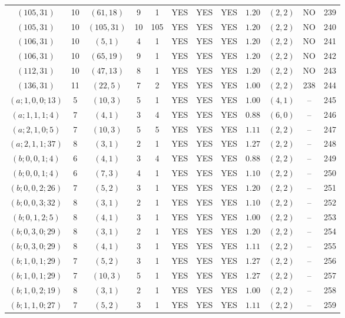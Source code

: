 \begin{longtable}{|c|c|c|c|c|c|c|c|c|c|c|c|}
$(105,31)$ & 10 & $(61,18)$ & 9 & 1 & YES & YES & YES & $1.20$ & $(2,2)$ & NO & 239\\
$(105,31)$ & 10 & $(105,31)$ & 10 & 105 & YES & YES & YES & $1.20$ & $(2,2)$ & NO & 240\\
$(106,31)$ & 10 & $(5,1)$ & 4 & 1 & YES & YES & YES & $1.20$ & $(2,2)$ & NO & 241\\
$(106,31)$ & 10 & $(65,19)$ & 9 & 1 & YES & YES & YES & $1.20$ & $(2,2)$ & NO & 242\\
$(112,31)$ & 10 & $(47,13)$ & 8 & 1 & YES & YES & YES & $1.20$ & $(2,2)$ & NO & 243\\
$(136,31)$ & 11 & $(22,5)$ & 7 & 2 & YES & YES & YES & $1.00$ & $(2,2)$ & 238 & 244\\
$(a;1,0,0;13)$ & 5 & $(10,3)$ & 5 & 1 & YES & YES & YES & $1.00$ & $(4,1)$ & -- & 245\\
$(a;1,1,1;4)$ & 7 & $(4,1)$ & 3 & 4 & YES & YES & YES & $0.88$ & $(6,0)$ & -- & 246\\
$(a;2,1,0;5)$ & 7 & $(10,3)$ & 5 & 5 & YES & YES & YES & $1.11$ & $(2,2)$ & -- & 247\\
$(a;2,1,1;37)$ & 8 & $(3,1)$ & 2 & 1 & YES & YES & YES & $1.27$ & $(2,2)$ & -- & 248\\
$(b;0,0,1;4)$ & 6 & $(4,1)$ & 3 & 4 & YES & YES & YES & $0.88$ & $(2,2)$ & -- & 249\\
$(b;0,0,1;4)$ & 6 & $(7,3)$ & 4 & 1 & YES & YES & YES & $1.10$ & $(2,2)$ & -- & 250\\
$(b;0,0,2;26)$ & 7 & $(5,2)$ & 3 & 1 & YES & YES & YES & $1.20$ & $(2,2)$ & -- & 251\\
$(b;0,0,3;32)$ & 8 & $(3,1)$ & 2 & 1 & YES & YES & YES & $1.10$ & $(2,2)$ & -- & 252\\
$(b;0,1,2;5)$ & 8 & $(4,1)$ & 3 & 1 & YES & YES & YES & $1.00$ & $(2,2)$ & -- & 253\\
$(b;0,3,0;29)$ & 8 & $(3,1)$ & 2 & 1 & YES & YES & YES & $1.20$ & $(2,2)$ & -- & 254\\
$(b;0,3,0;29)$ & 8 & $(4,1)$ & 3 & 1 & YES & YES & YES & $1.11$ & $(2,2)$ & -- & 255\\
$(b;1,0,1;29)$ & 7 & $(5,2)$ & 3 & 1 & YES & YES & YES & $1.27$ & $(2,2)$ & -- & 256\\
$(b;1,0,1;29)$ & 7 & $(10,3)$ & 5 & 1 & YES & YES & YES & $1.27$ & $(2,2)$ & -- & 257\\
$(b;1,0,2;19)$ & 8 & $(3,1)$ & 2 & 1 & YES & YES & YES & $1.00$ & $(2,2)$ & -- & 258\\
$(b;1,1,0;27)$ & 7 & $(5,2)$ & 3 & 1 & YES & YES & YES & $1.11$ & $(2,2)$ & -- & 259\\

\end{longtable}
